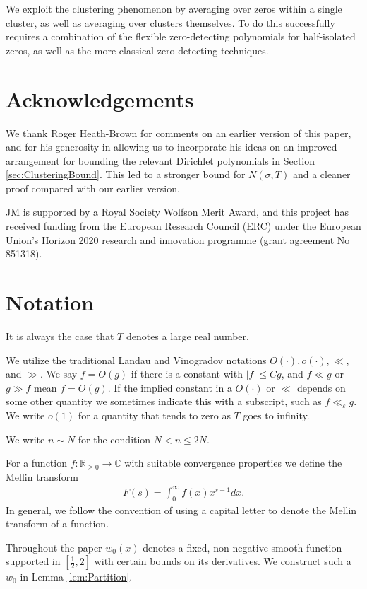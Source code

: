 \documentclass[12pt]{amsart}
\theoremstyle{plain}
\theoremstyle{definition}
\theoremstyle{remark}
\begin{document}
We exploit the clustering phenomenon by averaging over zeros within a single cluster, as well as averaging over clusters themselves. To do this successfully requires a combination of the flexible zero-detecting polynomials for half-isolated zeros, as well as the more classical zero-detecting techniques.
%
%
%
%
\section*{Acknowledgements}
We thank Roger Heath-Brown for comments on an earlier version of this paper, and for his generosity in allowing us to incorporate his ideas on an improved arrangement for bounding the relevant Dirichlet polynomials in Section \ref{sec:ClusteringBound}. This led to a stronger bound for $N(\sigma,T)$ and a cleaner proof compared with our earlier version.

 JM is supported by a Royal Society Wolfson Merit Award, and this project has received funding from the European Research Council (ERC) under the European Union’s Horizon 2020 research and innovation programme (grant agreement No 851318).
%
%
%
%
\section{Notation}

It is always the case that $T$ denotes a large real number.

We utilize the traditional Landau and Vinogradov notations $O(\cdot), o(\cdot), \ll$, and $\gg$. We say $f = O(g)$ if there is a constant with $|f| \leq Cg$, and $f\ll g$ or $g \gg f$ mean $f = O(g)$. If the implied constant in a $O(\cdot)$ or $\ll$ depends on some other quantity we sometimes indicate this with a subscript, such as $f \ll_\varepsilon g$. We write $o(1)$ for a quantity that tends to zero as $T$ goes to infinity.

We write $n \sim N$ for the condition $N < n \leq 2N$.

For a function $f: \mathbb{R}_{\geq 0} \rightarrow \mathbb{C}$ with suitable convergence properties we define the Mellin transform
\begin{align*}
F(s) = \int_0^\infty f(x) x^{s-1} dx.
\end{align*}
In general, we follow the convention of using a capital letter to denote the Mellin transform of a function.

Throughout the paper $w_0(x)$ denotes a fixed, non-negative smooth function supported in $[\frac{1}{2},2]$ with certain bounds on its derivatives. We construct such a $w_0$ in Lemma \ref{lem:Partition}.
\end{document}
